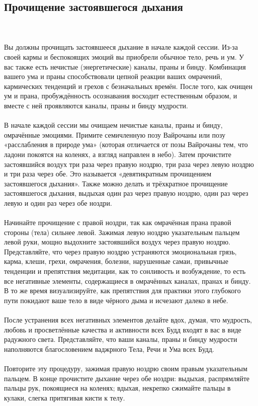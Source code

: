 \subsection{Прочищение застоявшегося дыхания}
\\ \\ Вы должны прочищать застоявшееся дыхание в начале каждой сессии. Из-за своей кармы и беспокоящих эмоций вы приобре\-ли обычное тело, речь и ум. У вас также есть нечистые (энергетические) каналы, праны и бинду. Комбинация вашего ума и праны способствовали цепной реакции ваших омрачений, кармических тенденций и грехов с безначальных времён. После того, как очищен ум и прана, пробуждённость осознавания восходит естественным образом, и вместе с ней проявляют\-ся каналы, праны и бинду мудрости.
\\ \\ В начале каждой сессии мы очищаем нечистые каналы, праны и бинду, омрачённые эмоциями. Примите семичленную позу Вайрочаны или позу «расслабления в природе ума» (которая отличается от позы Вайрочаны тем, что ладони покоятся на коленях, а взгляд направлен в небо). Затем прочистите застоявшийся воздух три раза через правую ноздрю, три раза через левую ноздрю и три раза через обе. Это называется «девятикратным прочищением застоявшегося дыхания». Также можно делать и трёхкратное прочищение застоявшегося дыхания, выдыхая один раз через правую ноздрю, один раз через левую и один раз через обе ноздри.
\\ \\ Начинайте прочищение с правой ноздри, так как омрачённая прана правой стороны (тела) сильнее левой. Зажимая левую ноздрю указательным пальцем левой руки, мощно выдохните застоявшийся воздух через правую ноздрю. Представляйте, что через правую ноздрю устраняются эмоциональная грязь, карма, клеши, грехи, омрачения, болезни, нарушенные самаи, привычные тенденции и препятствия медитации, как то сонливость и возбуждение, то есть все негативные элементы, содержащиеся в омрачённых каналах, пранах и бинду. В то же время визуализируйте, как препятствия для практики этого глубокого пути покидают ваше тело в виде чёрного дыма и исчезают далеко в небе.
\\ \\ После устранения всех негативных элементов делайте вдох, думая, что мудрость, любовь и просветлённые качества и активности всех Будд входят в вас в виде радужного света. Представляйте, что ваши каналы, праны и бинду мудрости наполняются благословением ваджрного Тела, Речи и Ума всех Будд.
\\ \\ Повторите эту процедуру, зажимая правую ноздрю своим правым указательным пальцем. В конце прочистите дыхание через обе ноздри: выдыхая, распрямляйте пальцы рук, покоящиеся на коленях; вдыхая, некрепко сжимайте пальцы в кулаки, слегка притягивая кисти к телу.
